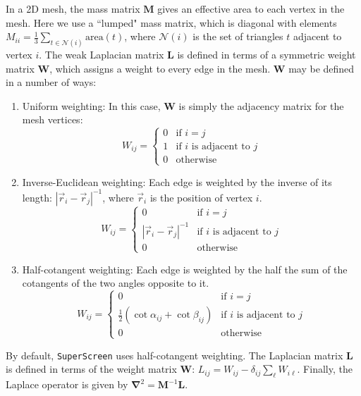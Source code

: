 \documentclass[final,3p,times]{elsarticle}
\newcommand{\inline}[1]{\texttt{#1}\xspace}
\newcommand{\SuperScreen}{\inline{SuperScreen}}
\newcounter{bla}
\begin{document}
In a 2D mesh, the mass matrix $\mathbf{M}$ gives an effective area to each vertex in the mesh. Here we use a ``lumped" mass matrix, which is diagonal with elements $M_{ii} = \frac{1}{3}\sum_{t\in\mathcal{N}(i)}\mathrm{area}(t)$,
where $\mathcal{N}(i)$ is the set of triangles $t$ adjacent to vertex $i$. The weak Laplacian matrix $\mathbf{L}$ is defined in terms of a symmetric weight matrix $\mathbf{W}$, which assigns a weight to every edge in the mesh. $\mathbf{W}$ may be defined in a number of ways:

\begin{enumerate}
    \item{
        Uniform weighting: In this case, $\mathbf{W}$ is simply the adjacency matrix for the mesh vertices:
        $$
            W_{ij} =
            \begin{cases}
                0&\text{if }i=j\\
                1&\text{if }i\text{ is adjacent to }j\\
                0&\text{otherwise}
            \end{cases}
        $$
    }
    \item{
        Inverse-Euclidean weighting: Each edge is weighted by the inverse of its length: $|\vec{r}_i-\vec{r}_j|^{-1}$, where $\vec{r}_i$ is the position of vertex $i$.
        $$
            W_{ij} =
            \begin{cases}
                0&\text{if }i=j\\
                |\vec{r}_i-\vec{r}_j|^{-1}&\text{if }i\text{ is adjacent to }j\\
                0&\text{otherwise}
            \end{cases}
        $$
    }
    \item{
        Half-cotangent weighting: Each edge is weighted by the half the sum of the cotangents of the two angles opposite to it.
        $$
            W_{ij} =
            \begin{cases}
                0&\text{if }i=j\\
                \frac{1}{2}\left(\cot\alpha_{ij}+\cot\beta_{ij}\right)&\text{if }i\text{ is adjacent to }j\\
                0&\text{otherwise}
            \end{cases}
        $$
    }
\end{enumerate}

By default, \SuperScreen uses half-cotangent weighting. The Laplacian matrix $\mathbf{L}$ is defined in terms of the weight matrix $\mathbf{W}$: $L_{ij} = W_{ij} - \delta_{ij}\sum_{\ell}W_{i\ell}$. Finally, the Laplace operator is given by $\mathbf{\nabla}^2 = \mathbf{M}^{-1}\mathbf{L}$.
\end{document}
